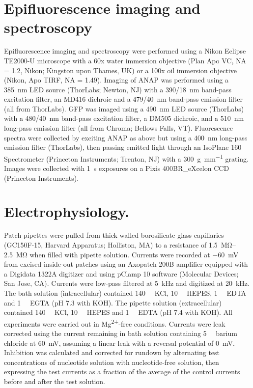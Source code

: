 \section{Epifluorescence imaging and spectroscopy}
Epifluorescence imaging and spectroscopy were performed using a Nikon Eclipse TE2000-U microscope with a 60x water immersion objective (Plan Apo VC, NA = 1.2, Nikon; Kingston upon Thames, UK) or a 100x oil immersion objective (Nikon, Apo TIRF, NA = 1.49).
Imaging of ANAP was performed using a \SI{385}{\nano\metre} LED source (ThorLabs; Newton, NJ) with a \SI{390/18}{\nano\metre} band-pass excitation filter, an MD416 dichroic and a \SI{479/40}{\nano\metre} band-pass emission filter (all from ThorLabs).
GFP was imaged using a \SI{490}{\nano\metre} LED source (ThorLabs) with a \SI{480/40}{\nano\metre} band-pass excitation filter, a DM505 dichroic, and a \SI{510}{\nano\metre} long-pass emission filter (all from Chroma; Bellows Falls, VT).
Fluorescence spectra were collected by exciting ANAP as above but using a \SI{400}{\nano\metre} long-pass emission filter (ThorLabs), then passing emitted light through an IsoPlane 160 Spectrometer (Princeton Instruments; Trenton, NJ) with a \SI{300}{\gram\per\milli\metre} grating.
Images were collected with \SI{1}{\second} exposures on a Pixis 400BR\_eXcelon CCD (Princeton Instruments).

\section{Electrophysiology.}
Patch pipettes were pulled from thick-walled borosilicate glass capillaries (GC150F-15, Harvard Apparatus; Holliston, MA) to a resistance of \SIrange{1.5}{2.5}{\mega\ohm} when filled with pipette solution.
Currents were recorded at \SI{-60}{\milli\volt} from excised inside-out patches using an Axopatch 200B amplifier equipped with a Digidata 1322A digitizer and using pClamp 10 software (Molecular Devices; San Jose, CA).
Currents were low-pass filtered at \SI{5}{\kilo\hertz} and digitized at \SI{20}{\kilo\hertz}.
The bath solution (intracellular) contained \SI{140}{\milli\Molar} KCl, \SI{10}{\milli\Molar} HEPES, \SI{1}{\milli\Molar} EDTA and \SI{1}{\milli\Molar} EGTA (pH 7.3 with KOH).
The pipette solution (extracellular) contained \SI{140}{\milli\Molar} KCl, \SI{10}{\milli\Molar} HEPES and \SI{1}{\milli\Molar} EDTA (pH 7.4 with KOH).
All experiments were carried out in Mg\textsuperscript{2+}-free conditions.
Currents were leak corrected using the current remaining in bath solution containing \SI{5}{\milli\Molar} barium chloride at \SI{+60}{\milli\volt}, assuming a linear leak with a reversal potential of \SI{0}{\milli\volt}.
Inhibition was calculated and corrected for rundown by alternating test concentrations of nucleotide solution with nucleotide-free solution, then expressing the test currents as a fraction of the average of the control currents before and after the test solution.

